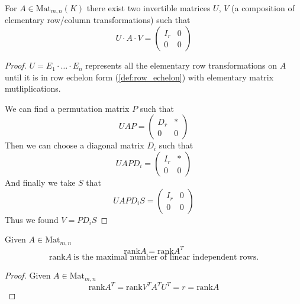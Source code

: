 \begin{theorem}
   For \(A \in \text{Mat}_{m,n}(K)\) there exist two invertible matrices \(U\), \(V\) (a composition of elementary row/column transformations) such that
   \[U \cdot A \cdot V = \left(\begin{array}{c|c} I_r & 0 \\ \hline 0 & 0 \end{array}\right)\]
\end{theorem}
\begin{proof}
   \(U = E_1 \cdot \ldots \cdot E_n\) represents all the elementary row transformations on \(A\) until it is in row echelon form (\ref{def:row_echelon}) with elementary matrix mutliplications.

   We can find a permutation matrix \(P\) such that
   \[UAP = \left(\begin{array}{c|c} D_r & * \\ \hline 0 & 0 \end{array}\right)\]
   Then we can choose a diagonal matrix \(D_i\) such that
   \[UAPD_i = \left(\begin{array}{c|c} I_r & * \\ \hline 0 & 0 \end{array}\right)\]
   And finally we take \(S\) that
   \[UAPD_iS = \left(\begin{array}{c|c} I_r & 0 \\ \hline 0 & 0 \end{array}\right)\]
   Thus we found \(V = PD_iS\)
\end{proof}

\begin{corollary}[\(\text{rank}A = \text{rank}A^T\)]
   Given \(A \in \text{Mat}_{m,n}\)
   \[\text{rank}A = \text{rank}A^T\]
   \[\text{rank}A~\text{is the maximal number of linear independent rows.}\]
\end{corollary}
\begin{proof}
   Given \(A \in \text{Mat}_{m,n}\)
   \[\text{rank}A^T = \text{rank}V^TA^TU^T = r = \text{rank}A\]
\end{proof}

